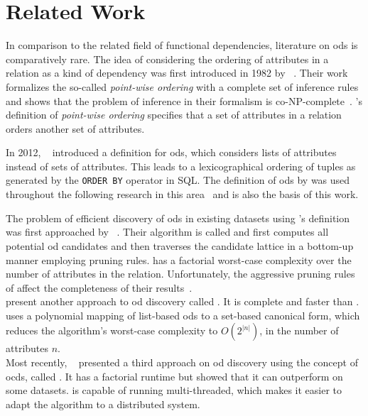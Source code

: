
\section{Related Work}\label{sec:related_work}
In comparison to the related field of functional dependencies, literature on \glspl{od} is comparatively rare.
The idea of considering the ordering of attributes in a relation as a kind of dependency was first introduced in 1982 by \citeauthor{ginsburg}~\cite{ginsburg}.
Their work formalizes the so-called \textit{point-wise ordering} with a complete set of inference rules and shows that the problem of inference in their formalism is co-NP-complete~\cite{ginsburg}.
\citeauthor{ginsburg}'s definition of \textit{point-wise ordering} specifies that a set of attributes in a relation orders another set of attributes.

In 2012, \citeauthor{szlichta:fundamentals}~\cite{szlichta:fundamentals} introduced a definition for \glspl{od}, which considers lists of attributes instead of sets of attributes.
This leads to a lexicographical ordering of tuples as generated by the \texttt{ORDER BY} operator in SQL.
The definition of \glspl{od} by \citeauthor{szlichta:fundamentals} was used throughout the following research in this area~\cite{consonni, langer, szlichta:discovery} and is also the basis of this work.

The problem of efficient discovery of \glspl{od} in existing datasets using \citeauthor{szlichta:fundamentals}'s definition was first approached by \citeauthor{langer}~\cite{langer}.
Their algorithm is called \order{} and first computes all potential \gls{od} candidates and then traverses the candidate lattice in a bottom-up manner employing pruning rules.
\order{} has a factorial worst-case complexity over the number of attributes in the relation.
Unfortunately, the aggressive pruning rules of \order{} affect the completeness of their results~\cite{szlichta:discovery}.\\
\citeauthor{szlichta:discovery} present another approach to \gls{od} discovery called \fastod{}.
It is complete and faster than \order{}.
\fastod{} uses a polynomial mapping of list-based \glspl{od} to a set-based canonical form, which reduces the algorithm's worst-case complexity to $O(2^{\left|n\right|})$, in the number of attributes $n$.\\
Most recently, \citeauthor{consonni}~\cite{consonni} presented a third approach on \gls{od} discovery using the concept of \glspl{ocd}, called \ocddiscover{}.
It has a factorial runtime but \citeauthor{consonni} showed that it can outperform \fastod{} on some datasets. 
\ocddiscover{} is capable of running multi-threaded, which makes it easier to adapt the algorithm to a distributed system.

